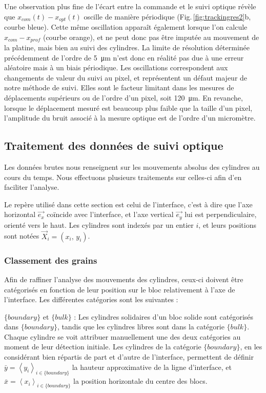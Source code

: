 Une observation plus fine de l'écart entre la commande et le suivi optique révèle que $x_{com}(t)-x_{opt}(t)$ oscille de manière périodique (Fig.\,\ref{fig:trackingres2}b, courbe bleue). Cette même oscillation apparaît également lorsque l'on calcule $x_{com}-x_{prof}$ (courbe orange), et ne peut donc pas être imputée au mouvement de la platine, mais bien au suivi des cylindres. La limite de résolution déterminée précédemment de l'ordre de \SI{5}{\micro\meter} n'est donc en réalité pas due à une erreur aléatoire mais à un biais périodique. Les oscillations correspondent aux changements de valeur du suivi au pixel, et représentent un défaut majeur de notre méthode de suivi. Elles sont le facteur limitant dans les mesures de déplacements supérieurs ou de l'ordre d'un pixel, soit \SI{120}{\micro\meter}. En revanche, lorsque le déplacement mesuré est beaucoup plus faible que la taille d'un pixel, l'amplitude du bruit associé à la mesure optique est de l'ordre d'un micromètre.


\subsection{Traitement des données de suivi optique}


Les données brutes nous renseignent sur les mouvements absolus des cylindres au cours du temps. Nous effectuons plusieurs traitements sur celles-ci afin d'en faciliter l'analyse.

Le repère utilisé dans cette section est celui de l'interface, c'est à dire que l'axe horizontal $\vec{e_x}$ coïncide avec l'interface, et l'axe vertical $\vec{e_y}$ lui est perpendiculaire, orienté vers le haut. Les cylindres sont indexés par un entier $i$, et leurs positions sont notées $\vec{X}_i = (x_i,\,y_i)$.



\subsubsection{Classement des grains}
\label{sec:classement}



Afin de raffiner l'analyse des mouvements des cylindres, ceux-ci doivent être catégorisés en fonction de leur position sur le bloc relativement à l'axe de l'interface. Les différentes catégories sont les suivantes :

\begin{itemize}
\bitem $\{boundary\}$ et $\{bulk\}$ : Les cylindres solidaires d'un bloc solide sont catégorisés dans $\{boundary\}$, tandis que les cylindres libres sont dans la catégorie $\{bulk\}$. Chaque cylindre se voit attribuer manuellement une des deux catégories au moment de leur détection initiale. Les cylindres de la catégorie $\{boundary\}$, en les considérant bien répartis de part et d'autre de l'interface, permettent de définir $\bar{y} = \left\langle y_i\right\rangle_{i\in\{boundary\}}$ la hauteur approximative de la ligne d'interface, et $\bar{x}= \left\langle x_i\right\rangle_{i\in\{boundary\}}$ la position horizontale du centre des blocs.
\end{itemize}

